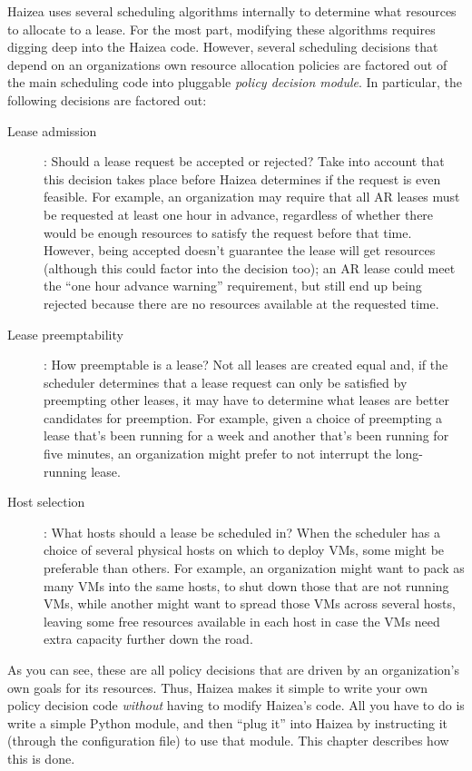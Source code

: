 Haizea uses several scheduling algorithms internally to determine what resources to allocate to a lease. For the most part, modifying these algorithms requires digging deep into the Haizea code. However, several scheduling decisions that depend on an organizations own resource allocation policies are factored out of the main scheduling code into pluggable \emph{policy decision module}. In particular, the following decisions are factored out:

\begin{description}
 \item[Lease admission]: Should a lease request be accepted or rejected? Take into account that this decision takes place before Haizea determines if the request is even feasible. For example, an organization may require that all AR leases must be requested at least one hour in advance, regardless of whether there would be enough resources to satisfy the request before that time. However, being accepted doesn't guarantee the lease will get resources (although this could factor into the decision too); an AR lease could meet the ``one hour advance warning'' requirement, but still end up being rejected because there are no resources available at the requested time.
 \item[Lease preemptability]: How preemptable is a lease? Not all leases are created equal and, if the scheduler determines that a lease request can only be satisfied by preempting other leases, it may have to determine what leases are better candidates for preemption. For example, given a choice of preempting a lease that's been running for a week and another that's been running for five minutes, an organization might prefer to not interrupt the long-running lease.
 \item[Host selection]: What hosts should a lease be scheduled in? When the scheduler has a choice of several physical hosts on which to deploy VMs, some might be preferable than others. For example, an organization might want to pack as many VMs into the same hosts, to shut down those that are not running VMs, while another might want to spread those VMs across several hosts, leaving some free resources available in each host in case the VMs need extra capacity further down the road.
\end{description}

As you can see, these are all policy decisions that are driven by an organization's own goals for its resources. Thus, Haizea makes it simple to write your own policy decision code \emph{without} having to modify Haizea's code. All you have to do is write a simple Python module, and then ``plug it'' into Haizea by instructing it (through the configuration file) to use that module. This chapter describes how this is done.

